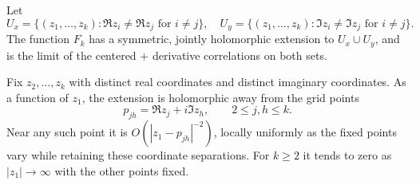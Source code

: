 \begin{lemma}\label{lem:chiral-holomorphy}
Let
\[
 U_x=\{(z_1,\ldots,z_k):\Re z_i\ne\Re z_j\text{ for }i\ne j\},
 \quad
 U_y=\{(z_1,\ldots,z_k):\Im z_i\ne\Im z_j\text{ for }i\ne j\}.
\]
The function $F_k$ has a symmetric, jointly holomorphic extension to
$U_x\cup U_y$, and is the limit of the centered $+$ derivative
correlations on both sets.

Fix $z_2,\ldots,z_k$ with distinct real coordinates and distinct imaginary
coordinates. As a function of $z_1$, the extension is holomorphic away
from the grid points
\begin{equation}\label{eq:chiral-grid-points}
                    p_{jh}=\Re z_j+i\Im z_h,\qquad 2\le j,h\le k.
\end{equation}
Near any such point it is $O(|z_1-p_{jh}|^{-2})$, locally uniformly
as the fixed points vary while retaining these coordinate separations.
For $k\ge2$ it tends to zero as $|z_1|\to\infty$ with the other points fixed.
\end{lemma}

